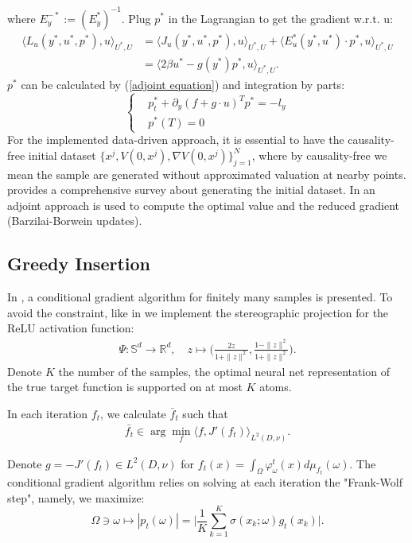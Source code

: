 \documentclass[12pt,fleqn]{amsart}
\theoremstyle{definition}
\begin{document}
where $E_y^{-*}:= (E_y^*)^{-1}$. 
Plug $p^*$ in the Lagrangian to get the gradient w.r.t. u:
\begin{align*}
	\langle L_u(y^*, u^*, p^*), u \rangle_{U^*, U} &= \langle J_u(y^*, u^*, p^*), u \rangle_{U^*, U} + \langle E_u^*(y^*, u^*) \cdot p^*, u \rangle_{U^*, U}\\
    &= \langle 2 \beta u^* - g(y^*) p^*, u\rangle_{U^*, U} . 
\end{align*}
$p^*$ can be calculated by (\ref{adjoint equation}) and integration by parts: 
\begin{equation*}
\left\{
\begin{aligned}
	& p^*_t + \partial_y(f + g \cdot u)^T p^* = -l_y\\
	& p^*(T) = 0
\end{aligned}
\right.
\end{equation*}
For the implemented data-driven approach, it is essential to have the causality-free initial dataset $\{x^j, V(0, x^j), \nabla V(0, x^j)\}_{j = 1}^N$, where by causality-free we mean the sample are generated without approximated valuation at nearby points. \cite{kang2021algorithms} provides a comprehensive survey about generating the initial dataset. In \cite{azmi2021optimal} an adjoint approach is used to compute the optimal value and the reduced gradient (Barzilai-Borwein updates). 


\subsection{Greedy Insertion}
In \cite{bach2017breaking}, a conditional gradient algorithm for finitely many samples is presented. 
To avoid the constraint, like in \cite{pieper2022nonconvex} we implement the stereographic projection for the ReLU activation function:
\begin{align*}
	\Psi: \mathbb{S}^d \rightarrow \mathbb{R}^d, \quad z \mapsto \bigg(\frac{2z}{1 + \|z\|^2}, \frac{1- \|z\|^2}{1 + \|z\|^2} \bigg).
\end{align*} 
Denote $K$ the number of the samples, the optimal neural net representation of the true target function is supported on at most $K$ atoms.  

In each iteration $f_t$, we calculate $\bar{f}_t$ such that 
\begin{align*}
	\bar{f_t} \in \arg \min_{f } \langle f, J'(f_t) \rangle_{L^2(D, \nu)}. 
\end{align*}

 Denote $g = - J'(f_t) \in L^2(D, \nu)$ for $f_t(x) = \int_{\Omega} \varphi_\omega^t(x) d\mu_{f_t}(\omega)$. The conditional gradient algorithm relies on solving at each iteration  the "Frank-Wolf step", namely, we maximize: 
\begin{equation}
	\Omega \ni \omega \mapsto |p_t(\omega)|= \bigg|\frac{1}{K} \sum_{k = 1}^K \sigma(x_k; \omega) g_t(x_k) \bigg|. 
\end{equation}
\end{document}
